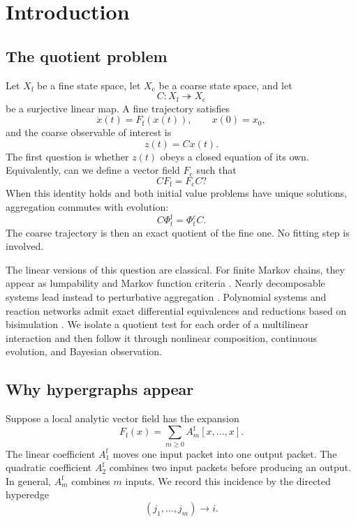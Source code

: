 \documentclass[11pt]{article}
\theoremstyle{definition}
\theoremstyle{remark}
\newcommand{\fine}{\mathrm f}
\newcommand{\coarse}{\mathrm c}
\begin{document}
\tableofcontents
\newpage

\section{Introduction}

\subsection{The quotient problem}
Let $X_{\fine}$ be a fine state space, let $X_{\coarse}$ be a coarse state space, and let
\[
  C:X_{\fine}\twoheadrightarrow X_{\coarse}
\]
be a surjective linear map.  A fine trajectory satisfies
\begin{equation}\label{eq:fine-flow-intro}
  \dot x(t)=F_{\fine}(x(t)),
  \qquad x(0)=x_0,
\end{equation}
and the coarse observable of interest is
\[
  z(t)=Cx(t).
\]
The first question is whether $z(t)$ obeys a closed equation of its own.  Equivalently, can we define a vector field $F_{\coarse}$ such that
\begin{equation}\label{eq:vector-field-quotient-intro}
  C F_{\fine}=F_{\coarse}C?
\end{equation}
When this identity holds and both initial value problems have unique solutions, aggregation commutes with evolution:
\begin{equation}\label{eq:flow-quotient-intro}
  C\Phi_t^{\fine}=\Phi_t^{\coarse}C.
\end{equation}
The coarse trajectory is then an exact quotient of the fine one.  No fitting step is involved.

The linear versions of this question are classical.  For finite Markov chains, they appear as lumpability and Markov function criteria \cite{KemenySnell1960,RogersPitman1981,Buchholz1994}.  Nearly decomposable systems lead instead to perturbative aggregation \cite{SimonAndo1961,Meyer1989}.  Polynomial systems and reaction networks admit exact differential equivalences and reductions based on bisimulation \cite{Cardelli2015,Cardelli2017}.  We isolate a quotient test for each order of a multilinear interaction and then follow it through nonlinear composition, continuous evolution, and Bayesian observation.

\subsection{Why hypergraphs appear}
Suppose a local analytic vector field has the expansion
\begin{equation}\label{eq:analytic-expansion-intro}
  F_{\fine}(x)=\sum_{m\geq0}A_m^{\fine}[x,\ldots,x].
\end{equation}
The linear coefficient $A_1^{\fine}$ moves one input packet into one output packet.  The quadratic coefficient $A_2^{\fine}$ combines two input packets before producing an output.  In general, $A_m^{\fine}$ combines $m$ inputs.  We record this incidence by the directed hyperedge
\[
  (j_1,\ldots,j_m)\longrightarrow i.
\]
\end{document}
